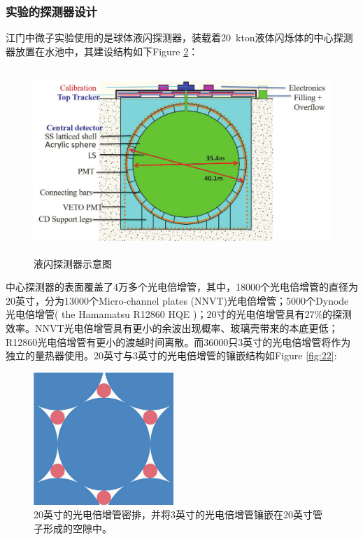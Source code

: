 \documentclass[10pt,a4paper]{article}
\begin{document}
\subsubsection{实验的探测器设计}\label{sub:4}

江门中微子实验使用的是球体液闪探测器，装载着\SI{20}{kton}液体闪烁体的中心探测器放置在水池中，其建设结构如下Figure \ref{fig:3}：\cite{Ludhova:2020vxz}
\begin{figure}[H]
 \centering
 \includegraphics[height=7cm]{images/探测器示意图.png}
 \caption{液闪探测器示意图}
 \label{fig:3}
\end{figure}

中心探测器的表面覆盖了4万多个光电倍增管，其中，18000个光电倍增管的直径为20英寸，分为13000个Micro-channel plates (NNVT)光电倍增管；5000个Dynode光电倍增管( the Hamamatsu R12860 HQE )；20寸的光电倍增管具有27\%的探测效率。NNVT光电倍增管具有更小的余波出现概率、玻璃壳带来的本底更低；R12860光电倍增管有更小的渡越时间离散。\cite{Steiger:2019khq}而36000只3英寸的光电倍增管将作为独立的量热器使用。20英寸与3英寸的光电倍增管的镶嵌结构如Figure \ref{fig:22}:
\begin{figure}[H]
 \centering
 \includegraphics[height=5cm]{images/PMTsyt.png}
 \caption{20英寸的光电倍增管密排，并将3英寸的光电倍增管镶嵌在20英寸管子形成的空隙中。\cite{Zhang:2017ewk}}
 \label{fig:3}
\end{figure}
\end{document}
